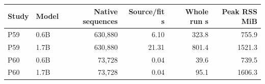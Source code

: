 \begin{tabular}{llrrrr}\toprule
Study & Model & Native sequences & Source/fit s & Whole run s & Peak RSS MiB\\\midrule
P59 & 0.6B & 630,880 & 6.10 & 323.8 & 755.9\\
P59 & 1.7B & 630,880 & 21.31 & 801.4 & 1521.3\\
P60 & 0.6B & 73,728 & 0.04 & 39.6 & 739.5\\
P60 & 1.7B & 73,728 & 0.04 & 95.1 & 1606.3\\
\bottomrule\end{tabular}
